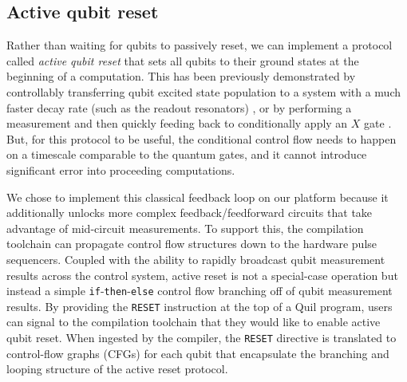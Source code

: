 \documentclass[12pt]{iopart}
\begin{document}
\subsection{Active qubit reset}

Rather than waiting for qubits to passively reset, we can implement a protocol called \textit{active qubit reset} that sets all qubits to their ground states at the beginning of a computation. This has been previously demonstrated by controllably transferring qubit excited state population to a system with a much faster decay rate (such as the readout resonators) \cite{EggerActiveReset, MagnardActiveReset, GoogleSupremacy}, or by performing a measurement and then quickly feeding back to conditionally apply an $X$ gate \cite{RisteActiveReset, RyanBBNHardware}. But, for this protocol to be useful, the conditional control flow needs to happen on a timescale comparable to the quantum gates, and it cannot introduce significant error into proceeding computations.

We chose to implement this classical feedback loop on our platform because it additionally unlocks more complex feedback/feedforward circuits that take advantage of mid-circuit measurements. To support this, the compilation toolchain can propagate control flow structures down to the hardware pulse sequencers. Coupled with the ability to rapidly broadcast qubit measurement results across the control system, active reset is not a special-case operation but instead a simple \texttt{if}-\texttt{then}-\texttt{else} control flow branching off of qubit measurement results. By providing the \texttt{RESET} instruction at the top of a Quil program, users can signal to the compilation toolchain that they would like to enable active qubit reset. When ingested by the compiler, the \texttt{RESET} directive is translated to control-flow graphs (CFGs) \cite{DragonBook} for each qubit that encapsulate the branching and looping structure of the active reset protocol. 
\end{document}
